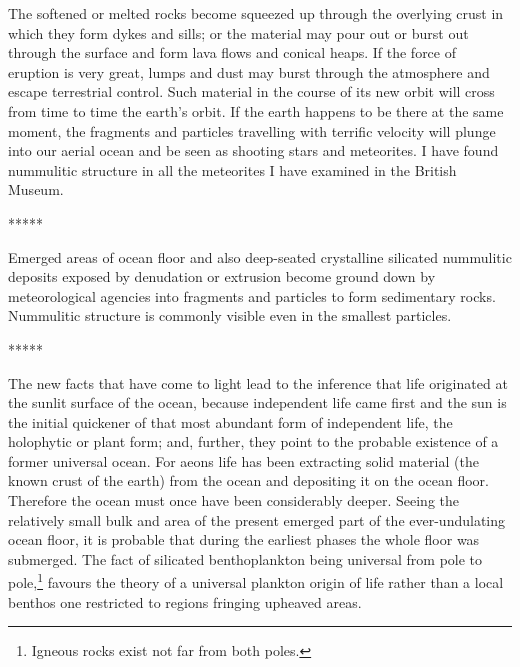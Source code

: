 \documentclass[a4paper, 12pt, oneside]{article}
\begin{document}
The softened or melted rocks become squeezed up through the overlying crust in which they form dykes and sills; or the material may pour out or burst out through the surface and form lava flows and conical heaps. If the force of eruption is very great, lumps and dust may burst through the atmosphere and escape terrestrial control. Such material in the course of its new orbit will cross from time to time the earth's orbit. If the earth happens to be there at the same moment, the fragments and particles travelling with terrific velocity will plunge into our aerial ocean and be seen as shooting stars and meteorites. I have found nummulitic structure in all the meteorites I have examined in the British Museum.

\centerline{*\hspace{15mm}*\hspace{15mm}*\hspace{15mm}*\hspace{15mm}*}
\bigskip

Emerged areas of ocean floor and also deep-seated crystalline silicated nummulitic deposits exposed by denudation or extrusion become ground down by meteorological agencies into fragments and particles to form sedimentary rocks. Nummulitic structure is commonly visible even in the smallest particles.

\centerline{*\hspace{15mm}*\hspace{15mm}*\hspace{15mm}*\hspace{15mm}*}
\bigskip

The new facts that have come to light lead to the inference that life originated at the sunlit surface of the ocean, because independent life came first and the sun is the initial quickener of that most abundant form of independent life, the holophytic or plant form; and, further, they point to the probable existence of a former universal ocean. For aeons life has been extracting solid material (the known crust of the earth) from the ocean and depositing it on the ocean floor. Therefore the ocean must once have been considerably deeper. Seeing the relatively small bulk and area of the present emerged part of the ever-undulating ocean floor, it is probable that during the earliest phases the whole floor was submerged. The fact of silicated benthoplankton being universal from pole to pole,\footnote{Igneous rocks exist not far from both poles.} favours the theory of a universal plankton origin of life rather than a local benthos one restricted to regions fringing upheaved areas.
\end{document}
